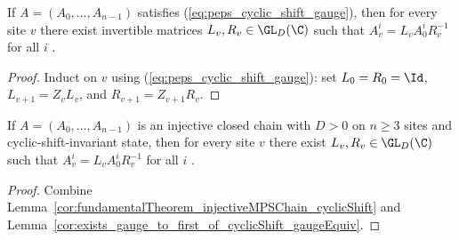 \begin{lemma}%
    \label{cor:exists_gauge_to_first_of_cyclicShift_gaugeEquiv}
    \leanok
    If $A=(A_0,\ldots,A_{n-1})$ satisfies (\ref{eq:peps_cyclic_shift_gauge}),
    then for every site $v$ there exist invertible matrices $L_v,R_v\in\GL_D(\C)$
    such that $A_v^i=L_v A_0^i R_v^{-1}$ for all $i$
    \cite[lines~1828--1862]{Molnar2018NormalPEPS}.
\end{lemma}
\begin{proof}\leanok
    Induct on $v$ using (\ref{eq:peps_cyclic_shift_gauge}): set $L_0=R_0=\Id$,
    $L_{v+1}=Z_v L_v$, and $R_{v+1}=Z_{v+1} R_v$.
\end{proof}

\begin{corollary}%
    \label{cor:exists_gauge_to_first_of_cyclicShiftInvariantState}
    \leanok
    If $A=(A_0,\ldots,A_{n-1})$ is an injective closed chain with $D>0$ on
    $n\ge 3$ sites and cyclic-shift-invariant state, then for every site $v$
    there exist $L_v,R_v\in\GL_D(\C)$ such that $A_v^i=L_v A_0^i R_v^{-1}$ for
    all $i$ \cite[lines~1803--1890]{Molnar2018NormalPEPS}.
\end{corollary}
\begin{proof}\leanok
    Combine Lemma~\ref{cor:fundamentalTheorem_injectiveMPSChain_cyclicShift}
    and Lemma~\ref{cor:exists_gauge_to_first_of_cyclicShift_gaugeEquiv}.
\end{proof}

